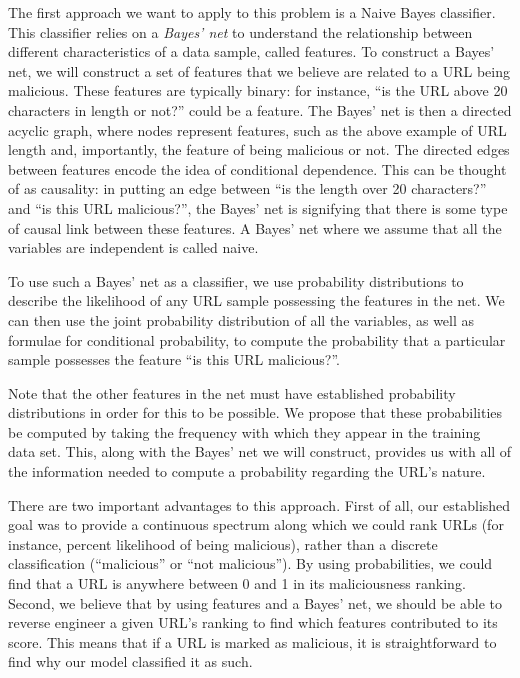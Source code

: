 \documentclass[cs,proposal]{hmcclinic}
\begin{document}
The first approach we want to apply to this problem is a Naive Bayes classifier. This classifier relies on a \textit{Bayes' net} to understand the relationship between different characteristics of a data sample, called features. To construct a Bayes' net, we will construct a set of features that we believe are related to a URL being malicious. These features are typically binary: for instance, ``is the URL above 20 characters in length or not?'' could be a feature. The Bayes' net is then a directed acyclic graph, where nodes represent features, such as the above example of URL length and, importantly, the feature of being malicious or not. The directed edges between features encode the idea of conditional dependence. This can be thought of as causality: in putting an edge between ``is the length over 20 characters?'' and ``is this URL malicious?'', the Bayes' net is signifying that there is some type of causal link between these features. A Bayes' net where we assume that all the variables are independent is called naive.

To use such a Bayes' net as a classifier, we use probability distributions to describe the likelihood of any URL sample possessing the features in the net. We can then use the joint probability distribution of all the variables, as well as formulae for conditional probability, to compute the probability that a particular sample possesses the feature ``is this URL malicious?''. 

Note that the other features in the net must have established probability distributions in order for this to be possible. We propose that these probabilities be computed by taking the frequency with which they appear in the training data set. This, along with the Bayes' net we will construct, provides us with all of the information needed to compute a probability regarding the URL's nature.

There are two important advantages to this approach. First of all, our established goal was to provide a continuous spectrum along which we could rank URLs (for instance, percent likelihood of being malicious), rather than a discrete classification (``malicious'' or ``not malicious''). By using probabilities, we could find that a URL is anywhere between 0 and 1 in its maliciousness ranking. Second, we believe that by using features and a Bayes' net, we should be able to reverse engineer a given URL's ranking to find which features contributed to its score. This means that if a URL is marked as malicious, it is straightforward to find why our model classified it as such.
\end{document}
